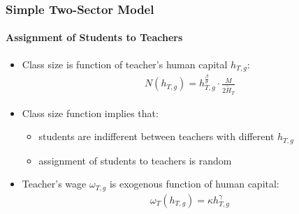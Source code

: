 \documentclass[11pt,hyperref={bookmarks=false},table,aspectratio=169]{beamer}
\begin{document}
	\begin{frame}
		\frametitle{Simple Two-Sector Model}
		\framesubtitle{Assignment of Students to Teachers}
			\begin{itemize}
				\item Class size is function of teacher's human capital $h_{T,g}$:
				\begin{align*}
                    N(h_{T,g})=h_{T,g}^\frac{\beta}{\sigma} \cdot \frac{M}{2\widetilde{H}_T}
				\end{align*}
				\item Class size function implies that:
				\begin{itemize}
  \item students are indifferent between teachers with different $h_{T,g}$
  \item assignment of students to teachers is random
\end{itemize} %
				\item Teacher's wage $\omega_{T,g}$ is exogenous function of human capital:
				\begin{align*}
					\omega_T(h_{T,g})  =  \kappa h_{T,g}^\gamma 

\end{align*}
\end{itemize}
\end{frame}
\end{document}
